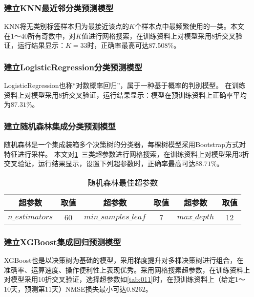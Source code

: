 \documentclass[withoutpreface,bwprint]{cumcmthesis}
\begin{document}
\subsubsection{建立KNN最近邻分类预测模型}

KNN将无类别标签样本归为最接近该点的$K$个样本点中最频繁使用的一类。本文在1～40所有奇数中，对$K$值进行网格搜索，在训练资料上对模型采用8折交叉验证，运行结果显示：$K=33$时，正确率最高可达$87.508\%$。

\subsubsection{建立LogisticRegression分类预测模型}

LogisticRegression也称“对数概率回归”，属于一种基于概率的判别模型。
在训练资料上对模型采用8折交叉验证，运行结果显示：模型在预训练资料上正确率平均为$87.31\%$。

\subsubsection{建立随机森林集成分类预测模型}

随机森林是一个集成装箱多个决策树的分类器，每棵树模型采用Bootstrap方式对特征进行采样。
本文对\cref{tab:010}~三类超参数进行网格搜索，在训练资料上对模型采用3折交叉验证，运行结果显示，设置下列超参数时，正确率最高可达$88.71\%$。

\begin{table}[!htbp]
    \caption{随机森林最佳超参数}\label{tab:010} \centering
    \begin{tabular}{cccccc}
        \toprule[1.5pt]
        超参数             & 取值 & 超参数                  & 取值 & 超参数          & 取值 \\
        \midrule[1pt]
        $n\_estimators$ & 60 & $min\_samples\_leaf$ & 7  & $max\_depth$ & 12 \\
        \bottomrule[1.5pt]
    \end{tabular}
\end{table}

\subsubsection{建立XGBoost集成回归预测模型}

XGBoost也是以决策树为基础的模型，采用梯度提升对多棵决策树进行组合，在准确率、运算速度、操作便利性上表现优秀。采用网格搜素超参数，在训练资料上对模型采用10折交叉验证，选择超参数如\cref{tab:011}时，在预训练资料上（给定1～10天，预测第11天）NMSE损失最小可达$0.8262$。
\end{document}
